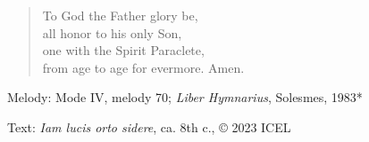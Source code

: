 \hymn



\setlength{\leftmargini}{2em}
\begin{verse}
To God the Father glory be,\\
all honor to his only Son,\\
one with the Spirit Paraclete,\\
from age to age for evermore. Amen.
\end{verse}
\setlength{\leftmargini}{\defleftmargini}

\begin{hymnsource}
Melody: Mode IV, melody 70; \emph{Liber Hymnarius}, Solesmes, 1983*

Text: \emph{Iam lucis orto sidere}, ca. 8th c., © 2023 ICEL
\end{hymnsource}
